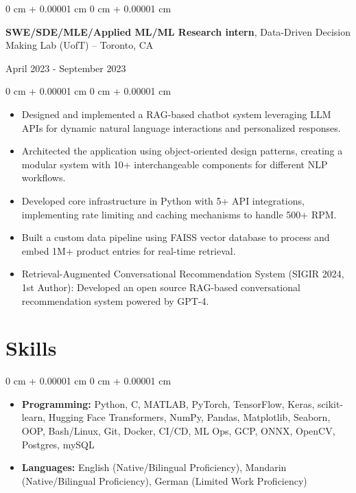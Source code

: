 \documentclass[11pt, letterpaper]{article}
\newenvironment{highlights}{
    \begin{itemize}[
        topsep=0.08 cm,
        parsep=0.08 cm,
        partopsep=0pt,
        itemsep=0pt,
        leftmargin=0.2 cm + 17pt
    ]
}
{
    \end{itemize}
}
\newenvironment{onecolentry}{
    \begin{adjustwidth}{
        0 cm + 0.00001 cm
    }{
        0 cm + 0.00001 cm
    }
}{
    \end{adjustwidth}
}
\newenvironment{twocolentry}[2][]{
    \onecolentry
    \def\secondColumn{#2}
    \setcolumnwidth{\fill, 4.5 cm}
    \begin{paracol}{2}
}{
    \switchcolumn \raggedleft \secondColumn
    \end{paracol}
    \endonecolentry
}
\begin{document}
\begin{twocolentry}{April 2023 - September 2023}
    {\textbf{SWE/SDE/MLE/Applied ML/ML Research intern}}, Data-Driven Decision Making Lab (UofT) -- Toronto, CA  
\end{twocolentry}  
\vspace{0.1cm}
\begin{onecolentry}
    \begin{highlights}
        \item Designed and implemented a RAG-based chatbot system leveraging LLM APIs for dynamic natural language interactions and personalized responses.
        \item Architected the application using object-oriented design patterns, creating a modular system with 10+ interchangeable components for different NLP workflows.
        \item Developed core infrastructure in Python with 5+ API integrations, implementing rate limiting and caching mechanisms to handle 500+ RPM.
        \item Built a custom data pipeline using FAISS vector database to process and embed 1M+ product entries for real-time retrieval.
        \item Retrieval-Augmented Conversational Recommendation System (SIGIR 2024, 1st Author): Developed an open source RAG-based conversational recommendation system powered by GPT-4.
    \end{highlights}
\end{onecolentry}

\section{Skills}
\vspace{0.08 cm}
\begin{onecolentry}
    \begin{highlights}
        \item \textbf{Programming:} Python, C, MATLAB, PyTorch, TensorFlow, Keras, scikit-learn, Hugging Face Transformers, NumPy, Pandas, Matplotlib, Seaborn, OOP, Bash/Linux, Git, Docker, CI/CD, ML Ops, GCP, ONNX, OpenCV, Postgres, mySQL
        \item \textbf{Languages:} English (Native/Bilingual Proficiency), Mandarin (Native/Bilingual Proficiency), German (Limited Work Proficiency)
    \end{highlights}
\end{onecolentry}
\end{document}
